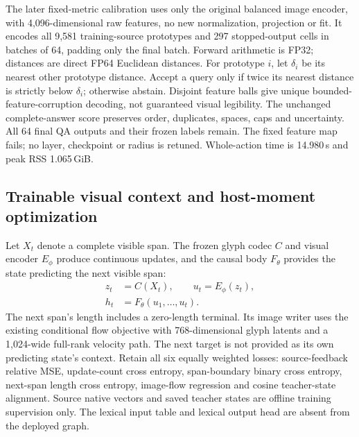 The later fixed-metric calibration uses only the original balanced image
encoder, with 4,096-dimensional raw features, no new normalization, projection
or fit. It encodes all 9,581 training-source prototypes and 297 stopped-output
cells in batches of 64, padding only the final batch. Forward arithmetic is
FP32; distances are direct FP64 Euclidean distances. For prototype $i$, let
$\delta_i$ be its nearest other prototype distance. Accept a query only if
twice its nearest distance is strictly below $\delta_i$; otherwise abstain.
Disjoint feature balls give unique bounded-feature-corruption decoding, not
guaranteed visual legibility. The unchanged complete-answer score preserves
order, duplicates, spaces, caps and uncertainty. All 64 final QA outputs and
their frozen labels remain. The fixed feature map fails; no layer, checkpoint
or radius is retuned. Whole-action time is 14.980\,s and peak RSS 1.065\,GiB.

\subsection*{Trainable visual context and host-moment optimization}

Let $X_t$ denote a complete visible span. The frozen glyph codec $C$ and visual
encoder $E_\phi$ produce continuous updates, and the causal body $F_\theta$
provides the state predicting the next visible span:
\begin{equation}
 \begin{aligned}
 z_t&=C(X_t),\qquad u_t=E_\phi(z_t),\\
 h_t&=F_\theta(u_1,\ldots,u_t).
 \end{aligned}
 \label{eq:trainable-visual-context}
\end{equation}
The next span's length includes a zero-length terminal. Its image writer uses
the existing conditional flow objective with 768-dimensional glyph latents and
a 1,024-wide full-rank velocity path. The next target is not provided as its
own predicting state's context. Retain all six equally weighted losses:
source-feedback relative MSE, update-count cross entropy, span-boundary binary
cross entropy, next-span length cross entropy, image-flow regression and
cosine teacher-state alignment. Source native vectors and saved teacher states
are offline training supervision only. The lexical input table and lexical
output head are absent from the deployed graph.

